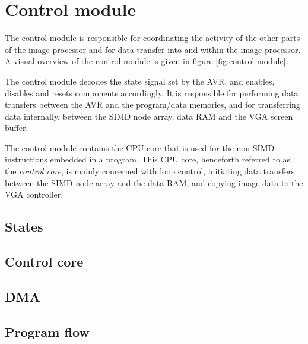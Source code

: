 \section{Control module}

The control module is responsible for coordinating the activity of the
other parts of the image processor and for data transfer into and within
the image processor. A visual overview of the control module is given in
figure \ref{fig:control-module}.



The control module decodes the state signal set by the AVR, and enables,
disables and resets components accordingly. It is responsible for
performing data transfers between the AVR and the program/data memories,
and for transferring data internally, between the SIMD node array, data
RAM and the VGA screen buffer.

The control module contains the CPU core that is used for the non-SIMD
instructions embedded in a program. This CPU core, henceforth referred
to as the \emph{control core}, is mainly concerned with loop control,
initiating data transfers between the SIMD node array and the data RAM,
and copying image data to the VGA controller.

\subsection{States}
\subsection{Control core}
\subsection{DMA}
\subsection{Program flow}
